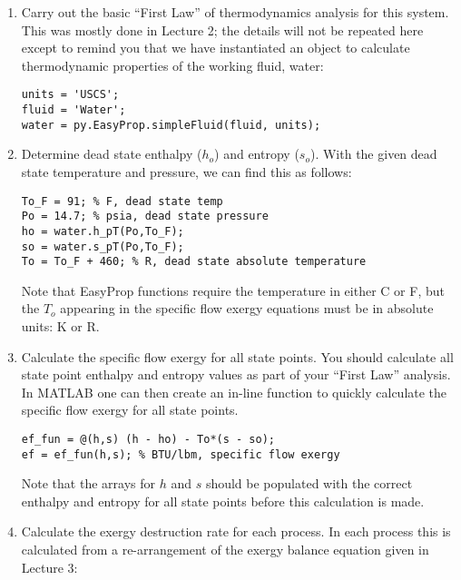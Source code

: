\begin{enumerate}
\item Carry out the basic ``First Law'' of thermodynamics analysis for this system.  This was mostly done in Lecture 2;  the details will not be repeated here except to remind you that we have instantiated an object to calculate thermodynamic properties of the working fluid, water:

\begin{lstlisting}[caption=Construct a \emph{simpleFluid} object]
units = 'USCS';
fluid = 'Water';
water = py.EasyProp.simpleFluid(fluid, units);
\end{lstlisting}

\item Determine dead state enthalpy ($h_o$) and entropy ($s_o$).  With the given dead state temperature and pressure, we can find this as follows:
\begin{lstlisting}[caption=Find dead state enthalpy and entropy]
To_F = 91; % F, dead state temp
Po = 14.7; % psia, dead state pressure
ho = water.h_pT(Po,To_F);
so = water.s_pT(Po,To_F);
To = To_F + 460; % R, dead state absolute temperature
\end{lstlisting}
Note that EasyProp functions require the temperature in either C or F, but the $T_o$ appearing in the specific flow exergy equations must be in absolute units: K or R.

\item Calculate the specific flow exergy for all state points.  You should calculate all state point enthalpy and entropy values as part of your ``First Law'' analysis.  In MATLAB one can then create an in-line function to quickly calculate the specific flow exergy for all state points.

\begin{lstlisting}[caption=Compute specific flow exergy for all state points]
ef_fun = @(h,s) (h - ho) - To*(s - so);
ef = ef_fun(h,s); % BTU/lbm, specific flow exergy 
\end{lstlisting}
Note that the arrays for $h$ and $s$ should be populated with the correct enthalpy and entropy for all state points before this calculation is made.
\item Calculate the exergy destruction rate for each process.  In each process this is calculated from a re-arrangement of the exergy balance equation given in Lecture 3:


\end{enumerate}
